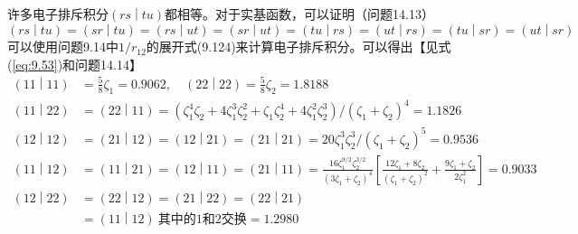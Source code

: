 \begin{examplebox}
        许多电子排斥积分$\left(rs \middle| tu\right)$都相等。对于实基函数，可以证明（问题14.13）
        \begin{equation}
            \left(rs \middle| tu\right) = \left(sr \middle| tu\right) = \left(rs \middle| ut\right) = \left(sr \middle| ut\right) = \left(tu \middle| rs\right) = \left(ut \middle| rs\right) = \left(tu \middle| sr\right) = \left(ut \middle| sr\right)
            \label{eq:14.47}
        \end{equation}
        可以使用问题9.14中$1/r_{12}$的展开式(9.124)来计算电子排斥积分。可以得出【见式(\ref{eq:9.53})和问题14.14】
        \begin{equation*}
            \begin{aligned}
                \left(11 \middle| 11\right) &= \frac{5}{8}\zeta_1 = 0.9062, \quad \left(22 \middle| 22\right) = \frac{5}{8}\zeta_2 = 1.8188 \\
                \left(11 \middle| 22\right) &= \left(22 \middle| 11\right) = \left(\zeta_1^4 \zeta_2 + 4 \zeta_1^3 \zeta_2^2 + \zeta_1 \zeta_2^4 + 4 \zeta_1^2 \zeta_2^3\right) / \left(\zeta_1 + \zeta_2\right)^4 = 1.1826 \\
                \left(12 \middle| 12\right) &= \left(21 \middle| 12\right) = \left(12 \middle| 21\right) = \left(21 \middle| 21\right) = 20\zeta_1^3 \zeta_2^3 / \left(\zeta_1 + \zeta_2\right)^5 = 0.9536 \\
                \left(11 \middle| 12\right) &= \left(11 \middle| 21\right) = \left(12 \middle| 11\right) = \left(21 \middle| 11\right) = \frac{16\zeta_1^{9/2}\zeta_2^{3/2}}{\left(3\zeta_1 + \zeta_2\right)^4} \left[\frac{12\zeta_1 + 8\zeta_2}{\left(\zeta_1 + \zeta_2\right)^2} + \frac{9\zeta_1 + \zeta_2}{2\zeta_1^2}\right] = 0.9033 \\
                \left(12 \middle| 22\right) &= \left(22 \middle| 12\right) = \left(21 \middle| 22\right) = \left(22 \middle| 21\right) \\
                &= \left(11 \middle| 12\right) \: \text{其中的1和2交换} = 1.2980
            \end{aligned}
        \end{equation*}


\end{examplebox}
